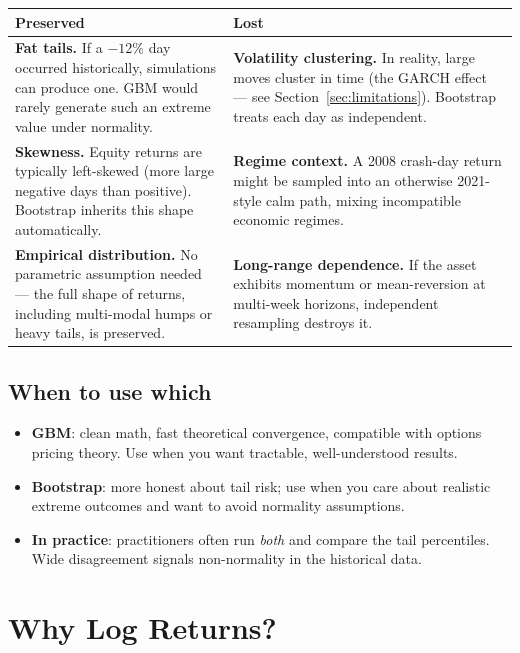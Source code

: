 \documentclass[11pt, a4paper]{article}
\begin{document}
\begin{center}
\begin{tabular}{p{5.5cm} p{8cm}}
  \toprule
  \textbf{Preserved} & \textbf{Lost} \\
  \midrule
  \textbf{Fat tails.} If a $-12\%$ day occurred historically, simulations can produce one. GBM would rarely generate such an extreme value under normality.
  &
  \textbf{Volatility clustering.} In reality, large moves cluster in time (the GARCH effect — see Section~\ref{sec:limitations}). Bootstrap treats each day as independent. \\[6pt]
  \textbf{Skewness.} Equity returns are typically left-skewed (more large negative days than positive). Bootstrap inherits this shape automatically.
  &
  \textbf{Regime context.} A 2008 crash-day return might be sampled into an otherwise 2021-style calm path, mixing incompatible economic regimes. \\[6pt]
  \textbf{Empirical distribution.} No parametric assumption needed — the full shape of returns, including multi-modal humps or heavy tails, is preserved.
  &
  \textbf{Long-range dependence.} If the asset exhibits momentum or mean-reversion at multi-week horizons, independent resampling destroys it. \\
  \bottomrule
\end{tabular}
\end{center}

\subsection*{When to use which}

\begin{itemize}[leftmargin=2em]
  \item \textbf{GBM}: clean math, fast theoretical convergence, compatible with options pricing theory. Use when you want tractable, well-understood results.
  \item \textbf{Bootstrap}: more honest about tail risk; use when you care about realistic extreme outcomes and want to avoid normality assumptions.
  \item \textbf{In practice}: practitioners often run \emph{both} and compare the tail percentiles. Wide disagreement signals non-normality in the historical data.
\end{itemize}

\section{Why Log Returns?}
\label{sec:logreturns}
\end{document}
